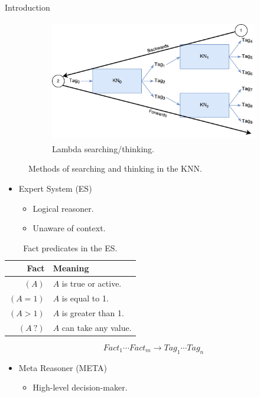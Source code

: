 \documentclass[final]{beamer} %
\begin{document}
\begin{frame}
\begin{columns}
\begin{column}{.3\textwidth}
{\begin{block}{Introduction}
\begin{figure}[!htb]
\begin{subfigure}[!htb]{0.4\columnwidth}
							\centering
							\includegraphics[height=2.1in]{figures/lambda_thinking.pdf}
							\caption{Lambda searching/thinking.}
							\label{think_lambda}
						\end{subfigure}
						\caption{Methods of searching and thinking in the KNN.}
					\end{figure}
					
					\begin{itemize}
						\item Expert System (ES)
						\begin{itemize}
							\item Logical reasoner.
							\item Unaware of context.
						\end{itemize}
					\end{itemize}
					
					\begin{table}[!htb]
						\centering
						\caption{Fact predicates in the ES.}
						\begin{tabular}{r | l}
							\textbf{Fact} & \textbf{Meaning} \\ \hline
							$(A)$ & $A$ is true or active.\\
							$(A = 1)$ & $A$ is equal to 1. \\
							$(A > 1)$ & $A$ is greater than 1. \\
							$(A \ ?)$ & $A$ can take any value.
						\end{tabular}
						\label{table:fact_predicates}
					\end{table}
					
					\begin{equation} \label{eq:rule}
					Fact_1 \cdots Fact_m \rightarrow Tag_1 \cdots Tag_n
					\end{equation}
					
					\begin{itemize}
						\item Meta Reasoner (META)
						\begin{itemize}
							\item High-level decision-maker.
						\end{itemize}
					\end{itemize}
				

\end{block}}
\end{column}
\end{columns}
\end{frame}
\end{document}
